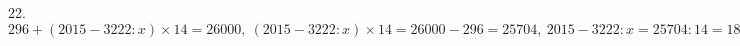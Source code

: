 22. $296+(2015-3222:x)\times 14=26000,\ (2015-3222:x)\times 14=26000-296=25704,\ 2015-3222:x=25704:14=1836,\ 3222:x=2015-1836-179,\ x=3222:179=18.$\\
